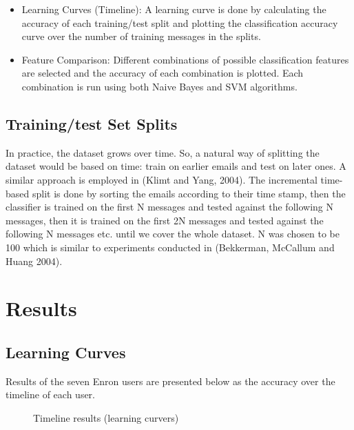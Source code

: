 \begin{itemize}
\item Learning Curves (Timeline): A learning curve is done by calculating the accuracy of each training/test split and plotting the classification accuracy curve over the number of training messages in the splits. 

\item Feature Comparison: Different combinations of possible classification features are selected and the accuracy of each combination is plotted. Each combination is run using both Naive Bayes and SVM algorithms.
\end{itemize}

\subsection{Training/test Set Splits}
In practice, the dataset grows over time. So, a natural way of splitting the dataset would be based on time: train on earlier emails and test on later ones. A similar approach is employed in (Klimt and Yang, 2004)\cite{KY04}. 
The incremental time-based split is done by sorting the emails according to their time stamp, then the classifier is trained on the first N messages and tested against the following N messages, then it is trained on the first 2N messages and tested against the following N messages etc. until we cover the whole dataset. N was chosen to be 100 which is similar to experiments conducted in (Bekkerman, McCallum and Huang 2004)\cite{RON04}.

\section{Results}

\subsection{Learning Curves}
Results of the seven Enron users are presented below as the accuracy over the timeline of each user.

\begin{figure}[H]
    \begin{center}
    \end{center}
    \caption{Timeline results (learning curvers)}
\end{figure}

